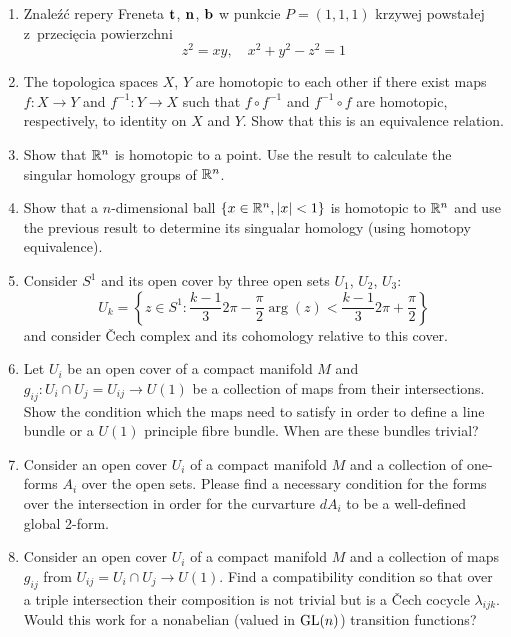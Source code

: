 \documentclass[a4paper,11pt]{article}
\begin{document}
\begin{enumerate}
\item Znaleźć repery Freneta $\mathbf{t}$, $\mathbf{n}$, $\mathbf{b}$ w
  punkcie $P = (1, 1, 1)$ krzywej powstałej z~przecięcia powierzchni
  \begin{equation}
    \label{eq:5}
    z^{ 2 } = xy, \quad
    x^{ 2 } + y^{ 2 } - z^{ 2 } = 1
  \end{equation}

\item The topologica spaces $X$, $Y$ are homotopic to each other if
  there exist maps $f : X \to Y$ and $f^{ -1 } : Y \to X$ such that
  $f \circ f^{ -1 }$ and $f^{ -1 } \circ f$ are homotopic,
  respectively, to identity on $X$ and $Y$. Show that this is an
  equivalence relation.

\item Show that $\mathbb{R}^{ n }$ is homotopic to a point. Use the result
  to calculate the singular homology groups of $\mathbb{R}^{ n }$.

\item Show that a $n$-dimensional ball
  $\{ x \in \mathbb{R}^{ n }, \lvert{  x  }\rvert < 1 \}$ is homotopic to $\mathbb{R}^{ n }$
  and use the previous result to determine its singualar homology
  (using homotopy equivalence).

\item Consider $S^{ 1 }$ and its open cover by three open sets
  $U_{ 1 }$, $U_{ 2 }$, $U_{ 3 }$:
  \begin{equation}
    \label{eq:7}
    U_{ k } =
    \left\{ z \in S^{ 1 } : \frac{ k - 1 }{ 3 } 2\pi - \frac{ \pi }{ 2 }
      \arg( z ) < \frac{ k - 1 }{ 3 } 2\pi + \frac{ \pi }{ 2 } \right\}
  \end{equation}
  and consider \v{C}ech complex and its cohomology relative to this
  cover.

\item Let $U_{ i }$ be an open cover of a compact manifold $M$ and
  $g_{ i j } : U_{ i } \cap U_{ j } = U_{ i j } \to U( 1 )$ be a
  collection of maps from their intersections. Show the condition
  which the maps need to satisfy in order to define a line bundle or a
  $U( 1 )$ principle fibre bundle. When are these bundles trivial?

\item Consider an open cover $U_{ i }$ of a compact manifold $M$ and a
  collection of one-forms $A_{ i }$ over the open sets. Please find a
  necessary condition for the forms over the intersection in order for
  the curvarture $dA_{ i }$ to be a well-defined global 2-form.

\item Consider an open cover $U_{ i }$ of a compact manifold $M$ and a
  collection of maps $g_{ ij }$ from
  $U_{ ij } = U_{ i } \cap U_{ j } \to U( 1 )$. Find a compatibility
  condition so that over a triple intersection their composition is
  not trivial but is a \v{C}ech cocycle $\lambda_{ i j k }$. Would
  this work for a nonabelian (valued in $\mathrm{GL}( n )$) transition
  functions?


\end{enumerate}
\end{document}
